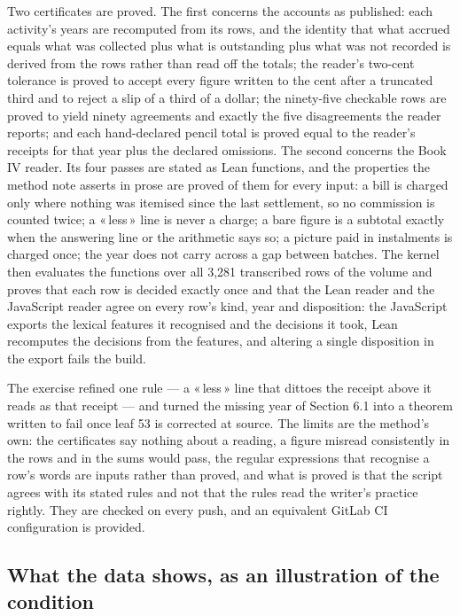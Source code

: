 \documentclass[11pt]{article}
\newcommand{\q}[1]{«\,#1\,»}
\begin{document}
Two certificates are proved. The first concerns the accounts as published: each activity's years are recomputed from its rows, and the identity that what accrued equals what was collected plus what is outstanding plus what was not recorded is derived from the rows rather than read off the totals; the reader's two-cent tolerance is proved to accept every figure written to the cent after a truncated third and to reject a slip of a third of a dollar; the ninety-five checkable rows are proved to yield ninety agreements and exactly the five disagreements the reader reports; and each hand-declared pencil total is proved equal to the reader's receipts for that year plus the declared omissions. The second concerns the Book IV reader. Its four passes are stated as Lean functions, and the properties the method note asserts in prose are proved of them for every input: a bill is charged only where nothing was itemised since the last settlement, so no commission is counted twice; a \q{less} line is never a charge; a bare figure is a subtotal exactly when the answering line or the arithmetic says so; a picture paid in instalments is charged once; the year does not carry across a gap between batches. The kernel then evaluates the functions over all 3,281 transcribed rows of the volume and proves that each row is decided exactly once and that the Lean reader and the JavaScript reader agree on every row's kind, year and disposition: the JavaScript exports the lexical features it recognised and the decisions it took, Lean recomputes the decisions from the features, and altering a single disposition in the export fails the build.

The exercise refined one rule --- a \q{less} line that dittoes the receipt above it reads as that receipt --- and turned the missing year of Section 6.1 into a theorem written to fail once leaf 53 is corrected at source. The limits are the method's own: the certificates say nothing about a reading, a figure misread consistently in the rows and in the sums would pass, the regular expressions that recognise a row's words are inputs rather than proved, and what is proved is that the script agrees with its stated rules and not that the rules read the writer's practice rightly. They are checked on every push, and an equivalent GitLab CI configuration is provided.

\subsection{What the data shows, as an illustration of the condition}
\end{document}
